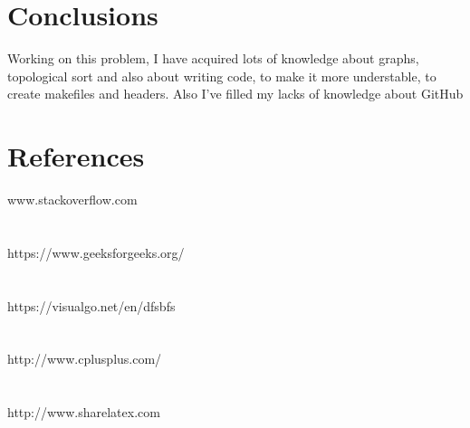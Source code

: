 \documentclass[14pt]{article}
\begin{document}
\newpage
\section*{Conclusions}
\vspace{20 mm}
Working on this problem, I have acquired lots of knowledge about graphs, topological sort and also about writing code, to make it more understable, to create makefiles and headers. Also I've filled my lacks of knowledge about GitHub
\\\vspace{20mm}
\section*{References}
\large www.stackoverflow.com
\\
\\\vspace{6mm}
\\
https://www.geeksforgeeks.org/
\\
\\\vspace{6mm}
\\
https://visualgo.net/en/dfsbfs
\\
\\\vspace{6mm}
\\
http://www.cplusplus.com/
\\
\\\vspace{6mm}
\\
http://www.sharelatex.com
\end{document}
